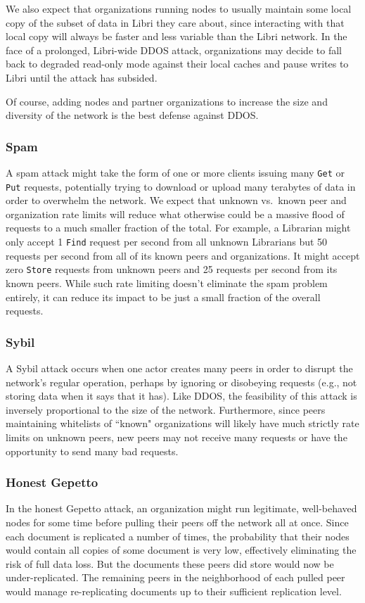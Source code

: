 \documentclass[10pt]{article}
\newcommand{\ttt}[1]{\texttt{#1}}
\def\Put{\ttt{Put}}
\def\Get{\ttt{Get}}
\begin{document}
We also expect that organizations running nodes to usually maintain some local copy of the subset of data in Libri they care about, since interacting with that local copy will always be faster and less variable than the Libri network. In the face of a prolonged, Libri-wide DDOS attack, organizations may decide to fall back to degraded read-only mode against their local caches and pause writes to Libri until the attack has subsided.

Of course, adding nodes and partner organizations to increase the size and diversity of the network is the best defense against DDOS.

\subsubsection{Spam}
A spam attack might take the form of one or more clients issuing many \Get{} or \Put{} requests, potentially trying to download or upload many terabytes of data in order to overwhelm the network. We expect that unknown vs.\ known peer and organization rate limits will reduce what otherwise could be a massive flood of requests to a much smaller fraction of the total. For example, a Librarian might only accept 1 \ttt{Find} request per second from all unknown Librarians but 50 requests per second from all of its known peers and organizations. It might accept zero \ttt{Store} requests from unknown peers and 25 requests per second from its known peers. While such rate limiting doesn't eliminate the spam problem entirely, it can reduce its impact to be just a small fraction of the overall requests.

\subsubsection{Sybil}
A Sybil attack occurs when one actor creates many peers in order to disrupt the network's regular operation, perhaps by ignoring or disobeying requests (e.g., not storing data when it says that it has). Like DDOS, the feasibility of this attack is inversely proportional to the size of the network. Furthermore, since peers maintaining whitelists of ``known" organizations will likely have much strictly rate limits on unknown peers, new peers may not receive many requests or have the opportunity to send many bad requests.

\subsubsection{Honest Gepetto}
In the honest Gepetto \cite{storj} attack, an organization might run legitimate, well-behaved nodes for some time before pulling their peers off the network all at once. Since each document is replicated a number of times, the probability that their nodes would contain all copies of some document is very low, effectively eliminating the risk of full data loss. But the documents these peers did store would now be under-replicated. The remaining peers in the neighborhood of each pulled peer would manage re-replicating documents up to their sufficient replication level.
\end{document}
